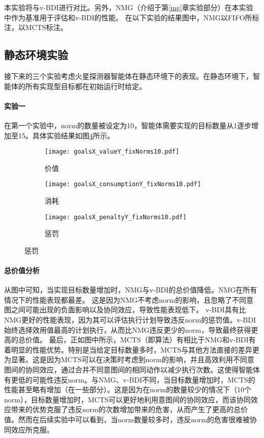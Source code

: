 本实验将\SAN 与v-BDI进行对比。另外，NMG（介绍于第\ref{mg}章实验部分）在本实验中作为基准用于评估\SAN 和v-BDI的性能。
在以下实验的结果图中，NMG以FIFO所标注，\SAN 以MCTS标注。
\subsection{静态环境实验}
接下来的三个实验考虑火星探测器智能体在静态环境下的表现。在静态环境下，智能体的所有实现型目标都在初始运行时给定。
\paragraph{实验一}
在第一个实验中，norm的数量被设定为10，智能体需要实现的目标数量从1逐步增加至15。具体实验结果如图\ref{fig:all_fixNorms10}所示。

\begin{figure}
\centering
\begin{subfigure}{.47\textwidth}
  \centering
  \texttt{[image: goalsX\_valueY\_fixNorms10.pdf]}
  \captionsetup{justification=centering}
  \caption{价值}
  \label{fig:goalsX_valueY_fixNorms10}
\end{subfigure}

\begin{subfigure}{.47\textwidth}
  \centering
  \texttt{[image: goalsX\_consumptionY\_fixNorms10.pdf]}
  \captionsetup{justification=centering}
  \caption{消耗}
  \label{fig:goalsX_consumptionY_fixNorms10}
\end{subfigure}
\begin{subfigure}{.47\textwidth}
  \centering
  \texttt{[image: goalsX\_penaltyY\_fixNorms10.pdf]}
  \captionsetup{justification=centering}
  \caption{惩罚}
  \label{fig:goalsX_penaltyY_fixNorms10}
\end{subfigure}
\captionsetup{justification=centering}
\label{fig:all_fixNorms10}
\end{figure}

\paragraph{总价值分析}
从图中可知，当实现目标数量增加时，NMG与v-BDI的总价值降低。NMG在所有情况下的性能表现都最差。
这是因为NMG不考虑norm的影响，且忽略了不同意图之间可能出现的负面影响以及协同效应，导致性能表现低下。
v-BDI具有比NMG更好的性能表现，因为其可以评估执行计划导致违反norm的惩罚值。v-BDI始终选择效用值最高的计划执行，从而比NMG违反更少的norm，导致最终获得更高的总价值。
最后，正如图中所示，MCTS（即\SAN 算法）有相比于NMG和v-BDI有着明显的性能优势。特别是当给定目标数量多时，MCTS与其他方法直接的差异更为显著。这是因为MCTS可以在决策时考虑到norm的影响，并且高效利用不同意图间的协同效应，通过合并不同意图间的相同动作以减少执行次数。这使得智能体有更低的可能性违反norm。与NMG、v-BDI不同，当目标数量增加时，MCTS的性能甚至略有增加（在一些部分）。这是因为在norm的数量较少的情况下（10个norm），目标数量增加时，MCTS可以更好地利用意图间的协同效应，而该协同效应带来的优势克服了违反norm的次数增加带来的危害，从而产生了更高的总价值。然而在后续实验中可以看到，当norm数量较多时，违反norm的危害很难被协同效应所克服。

